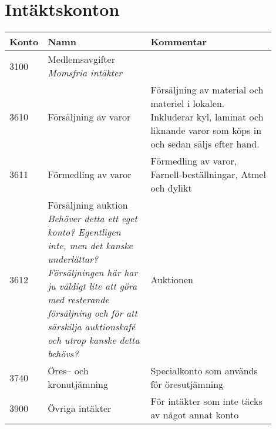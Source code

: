 \section{Intäktskonton}
\begin{minipage}{\fullwidthlength}
	\begin{longtable}[l]{l p{0.4\linewidth} p{0.5\linewidth}}
		Konto	&	Namn								& Kommentar \\ \toprule \endhead
		3100	&	Medlemsavgifter \newline \emph{Momsfria intäkter} \\
		3610	&	Försäljning av varor				& Försäljning av material och materiel i lokalen. Inkluderar kyl, laminat och liknande varor som köps in och sedan säljs efter hand.\\
		3611	&	Förmedling av varor					& Förmedling av varor, Farnell-beställningar, Atmel och dylikt\\
		3612	&	Försäljning auktion \emph{Behöver detta ett eget konto? Egentligen inte, men det kanske underlättar? Försäljningen här har ju väldigt lite att göra med resterande försäljning och för att särskilja auktionskafé och utrop kanske detta behövs?} & Auktionen\\
		3740	&	Öres-- och kronutjämning			& Specialkonto som används för öresutjämning\\
		3900	&	Övriga intäkter						& För intäkter som inte täcks av något annat konto
	\end{longtable}
\end{minipage}

